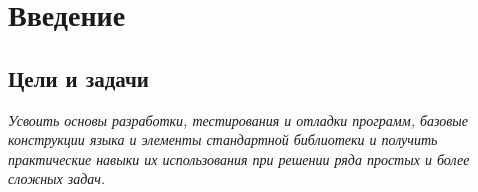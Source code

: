 
\chapter{Введение}

\section{Цели и задачи}
\textit{Усвоить основы разработки, тестирования и отладки программ, базовые конструкции языка  и элементы стандартной библиотеки и получить практические навыки их использования при решении ряда простых и более сложных задач.}


